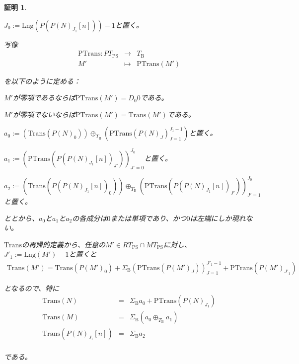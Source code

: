 \documentclass[dvipdfmx,uplatex]{jsarticle}
\theoremstyle{customnonumberbreakfortheorem}
\theoremstyle{customnonumberbreakforproof}
\newtheorem{hideableproof}{証明}
\begin{document}
\begin{hideableproof}
\begin{indented}
\begin{indented}
\begin{indented}
				\item \(J_0 := \textrm{Lng}(P(P(N)_{J_1}[n]))-1\)と置く。
				\item 写像
				\begin{eqnarray*}
				\textrm{PTrans} \colon PT_{\textrm{PS}} & \to & T_{\textrm{B}} \\
				M' & \mapsto & \textrm{PTrans}(M')
				\end{eqnarray*}
				\item を以下のように定める：
				\begin{indented}
					\item \(M'\)が零項であるならば\(\textrm{PTrans}(M') = D_0 0\)である。
					\item \(M'\)が零項でないならば\(\textrm{PTrans}(M') = \textrm{Trans}(M')\)である。
				\end{indented}
				\item \(a_0 := (\textrm{Trans}(P(N)_0)) \oplus_{T_{\textrm{B}}} (\textrm{PTrans}(P(N)_J)_{J=1}^{J_1-1})\)と置く。
				\item \(a_1 := (\textrm{PTrans}(P(P(N)_{J_1}[n])_{J'}))_{J'=0}^{J_0}\)と置く。
				\item \(a_2 := (\textrm{Trans}(P(P(N)_{J_1}[n])_0)) \oplus_{T_{\textrm{B}}} (\textrm{PTrans}(P(P(N)_{J_1}[n])_{J'}))_{J'=1}^{J_0}\)と置く。
				\item {}ととから、\(a_0\)と\(a_1\)と\(a_2\)の各成分は\(0\)または単項であり、かつ\(0\)は左端にしか現れない。
				\item \(\textrm{Trans}\)の再帰的定義から、任意の\(M' \in RT_{\textrm{PS}} \cap MT_{\textrm{PS}}\)に対し、\(J'_1 := \textrm{Lng}(M')-1\)と置くと
				\begin{eqnarray*}
				\textrm{Trans}(M') = \textrm{Trans}(P(M')_0) + \Sigma_{\textrm{B}} (\textrm{PTrans}(P(M')_J))_{J=1}^{J'_1-1} + \textrm{PTrans}(P(M')_{J'_1})
				\end{eqnarray*}
				\item となるので、特に
				\begin{eqnarray*}
				\textrm{Trans}(N) & = & \Sigma_{\textrm{B}} a_0 + \textrm{PTrans}(P(N)_{J_1}) \\
				\textrm{Trans}(M) & = & \Sigma_{\textrm{B}} (a_0 \oplus_{T_{\textrm{B}}} a_1) \\
				\textrm{Trans}(P(N)_{J_1}[n]) & = & \Sigma_{\textrm{B}} a_2 \\
				\end{eqnarray*}
				\item である。

\end{indented}
\end{indented}
\end{indented}
\end{hideableproof}
\end{document}
